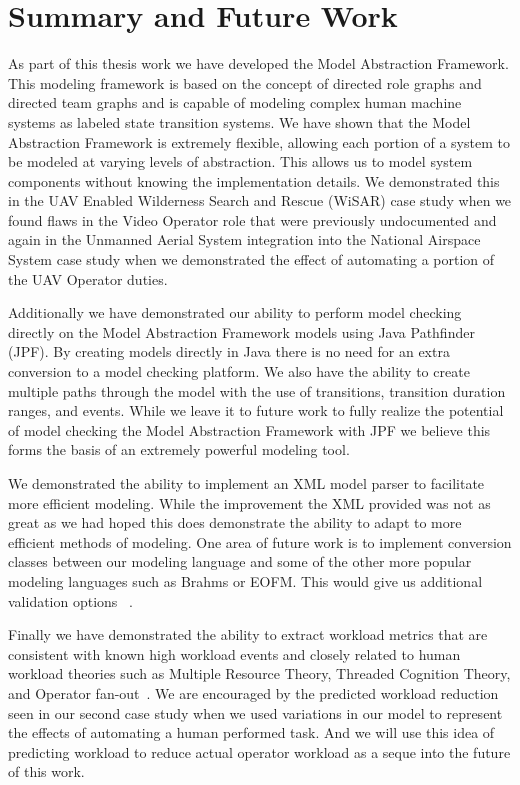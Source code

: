 \chapter{Summary and Future Work}

As part of this thesis work we have developed the Model Abstraction Framework.  This modeling framework is based on the concept of directed role graphs and directed team graphs and is capable of modeling complex human machine systems as labeled state transition systems.  We have shown that the Model Abstraction Framework is extremely flexible, allowing each portion of a system to be modeled at varying levels of abstraction.  This allows us to model system components without knowing the implementation details.  We demonstrated this in the UAV Enabled Wilderness Search and Rescue (WiSAR) case study when we found flaws in the Video Operator role that were previously undocumented and again in the Unmanned Aerial System integration into the National Airspace System case study when we demonstrated the effect of automating a portion of the UAV Operator duties.  

Additionally we have demonstrated our ability to perform model checking directly on the Model Abstraction Framework models using Java Pathfinder (JPF).  By creating models directly in Java there is no need for an extra conversion to a model checking platform.  We also have the ability to create multiple paths through the model with the use of transitions, transition duration ranges, and events. While we leave it to future work to fully realize the potential of model checking the Model Abstraction Framework with JPF we believe this forms the basis of an extremely powerful modeling tool.

We demonstrated the ability to implement an XML model parser to facilitate more efficient modeling.  While the improvement the XML provided was not as great as we had hoped this does demonstrate the ability to adapt to more efficient methods of modeling.  One area of future work is to implement conversion classes between our modeling language and some of the other more popular modeling languages such as Brahms or EOFM.  This would give us additional validation options ~\cite{bolton2013litreview}.

Finally we have demonstrated the ability to extract workload metrics that are consistent with known high workload events and closely related to human workload theories such as Multiple Resource Theory, Threaded Cognition Theory, and Operator fan-out~\cite{wickens2002multiple, salvucci2008threaded, cummings2007predicting}.  We are encouraged by the predicted workload reduction seen in our second case study when we used variations in our model to represent the effects of automating a human performed task.  And we will use this idea of predicting workload to reduce actual operator workload as a seque into the future of this work.

